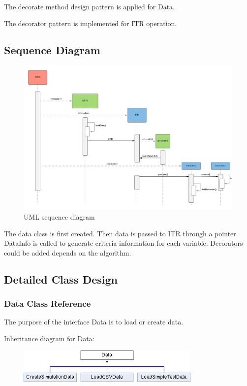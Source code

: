 \documentclass{article}
\begin{document}
The decorate method design pattern is applied for Data.

The decorator pattern is implemented for ITR operation.

\subsection{Sequence Diagram}
\begin{figure}[H]
\centering
\caption{UML sequence diagram}
\includegraphics[width=1\textwidth]{UML_Seq.png}
\end{figure}

The data class is first created. Then data is passed to ITR through a pointer. DataInfo is called to generate criteria information for each variable. Decorators could be added depends on the algorithm.



\subsection{Detailed Class Design}
\subsubsection{Data Class Reference}
The purpose of the interface Data is to load or create data.

Inheritance diagram for Data:
\begin{figure}[H]
\centering
\includegraphics[width=0.8\textwidth]{class_data.png}
\end{figure}
\end{document}
